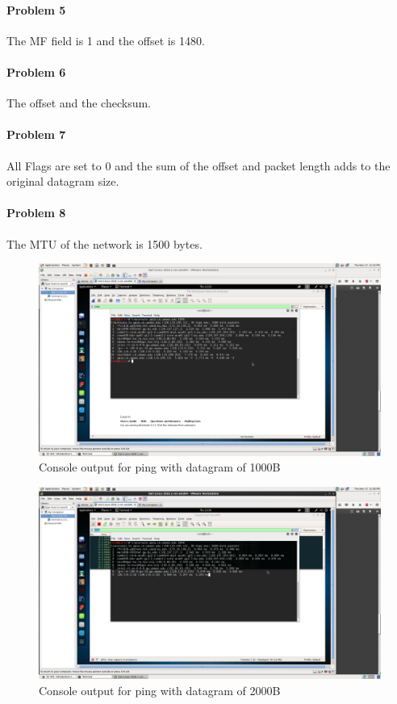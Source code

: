 \documentclass[12pt]{article}
\begin{document}
\paragraph{Problem 5}
The MF field is 1 and the offset is 1480.
\paragraph{Problem 6}
The offset and the checksum.
\paragraph{Problem 7}
All Flags are set to 0 and the sum of the offset and packet length adds to the original datagram size.
\paragraph{Problem 8}
The MTU of the network is 1500 bytes.

\begin{figure}[H]
	\caption{Console output for ping with datagram of 1000B}
	\centering
	\includegraphics[width=\textwidth,height=\textheight,keepaspectratio,scale=0.5=0.5]{tr1000}
\end{figure}

\begin{figure}[H]
	\caption{Console output for ping with datagram of 2000B}
	\centering
	\includegraphics[width=\textwidth,height=\textheight,keepaspectratio,scale=0.5=0.5]{tr2000}
\end{figure}
\end{document}
